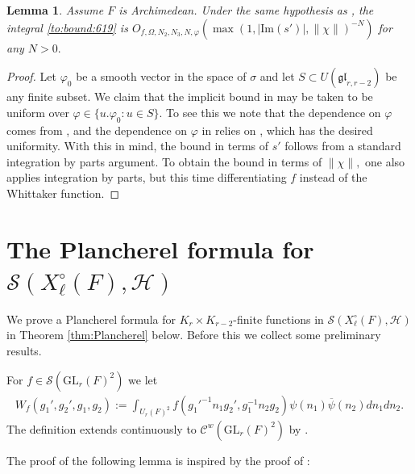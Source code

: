 \documentclass[12pt]{amsart}
\newtheorem{lem}[thm]{Lemma}
\theoremstyle{remark}
\numberwithin{equation}{section}
\newcommand{\GL}{\mathrm{GL}}
\theoremstyle{definition}
\numberwithin{equation}{subsection}
\newcommand{\norm}[1]{\lVert#1\rVert}
\begin{document}
\begin{lem} \label{lem:uniform:ZfW} Assume $F$ is Archimedean. Under the same hypothesis as , the integral \eqref{to:bound:619} is $O_{f,\Omega,N_2,N_3,N,\varphi}(\max\left(1,|\mathrm{Im}(s')|,\norm{\chi}\right)^{-N})
$
for any $N >0.$
\end{lem}


\begin{proof}
Let $\varphi_0$ be a smooth vector in the space of $\sigma$ and let $S \subset U(\mathfrak{gl}_{r,r-2})$ be any finite subset.
We claim that the implicit bound in  may be taken to be uniform over $\varphi \in \{u.\varphi_0:u \in S\}.$  To see this we note that the dependence on $\varphi$ comes from , and the dependence on $\varphi$ in  relies on , which has the desired uniformity.  
With this in mind, the bound in terms of $s'$ follows from  
a standard integration by parts argument.  To obtain the bound in terms of $\norm{\chi},$ one also applies integration by parts, but this time differentiating $f$ instead of the Whittaker function. 
\end{proof}


 
 
 
 

 







\section{The Plancherel formula for $\mathcal{S}(X_\ell^\circ(F),\mathcal{H})$} \label{sec:Pl:Xcir}

We prove a Plancherel formula for $K_{r} \times K_{r-2}$-finite functions in $\mathcal{S}(X^{\circ}_{\ell}(F),\mathcal{H})$ in Theorem \ref{thm:Plancherel} below.  Before this we collect some preliminary results.

For $f\in \mathcal{S}(\GL_r(F)^2)$ we let 
\begin{align}
    W_f(g_1',g_2',g_1,g_2):=\int_{U_r(F)^2} f(g_1'^{-1}n_1g_2',g_1^{-1}n_2g_2)\psi(n_1)\overline{\psi}(n_2)dn_1dn_2.
\end{align}
The definition extends continuously to $\mathcal{C}^w(\GL_r(F)^2)$ by \cite[Lemma 2.14.1]{BP:GLn}.

The proof of the following lemma is inspired by the proof of \cite[Proposition 4.3.1]{BP:GLn}:
\end{document}

